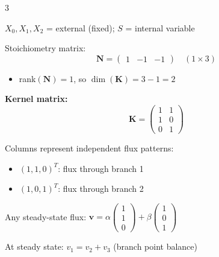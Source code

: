 \documentclass[10pt,landscape,letter]{article}
\begin{document}
\begin{multicols}{3}
\begin{center}
\end{center}

$X_0, X_1, X_2$ = external (fixed); $S$ = internal variable

Stoichiometry matrix:
\begin{equation*}
\mathbf{N} = \begin{pmatrix} 1 & -1 & -1 \end{pmatrix} \quad (1 \times 3)
\end{equation*}

\begin{itemize}
\item rank$(\mathbf{N}) = 1$, so $\dim(\mathbf{K}) = 3 - 1 = 2$
\end{itemize}

\textbf{Kernel matrix:}
\begin{equation*}
\mathbf{K} = \begin{pmatrix} 1 & 1 \\ 1 & 0 \\ 0 & 1 \end{pmatrix}
\end{equation*}

Columns represent independent flux patterns:
\begin{itemize}
\item $(1,1,0)^T$: flux through branch 1
\item $(1,0,1)^T$: flux through branch 2
\end{itemize}

Any steady-state flux: $\mathbf{v} = \alpha \begin{pmatrix}1\\1\\0\end{pmatrix} + \beta \begin{pmatrix}1\\0\\1\end{pmatrix}$

At steady state: $v_1 = v_2 + v_3$ (branch point balance)


\end{multicols}
\end{document}
